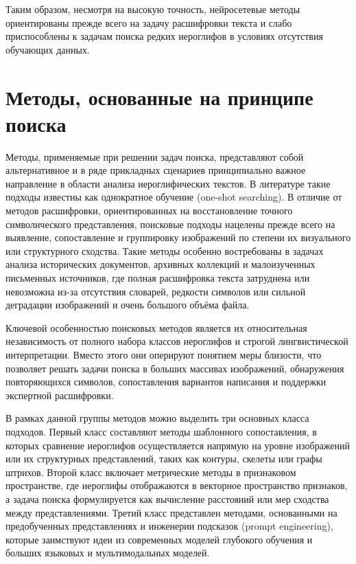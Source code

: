 Таким образом, несмотря на высокую точность, нейросетевые методы ориентированы прежде всего на задачу расшифровки текста и слабо приспособлены к задачам поиска редких иероглифов в условиях отсутствия обучающих данных.


\section{Методы, основанные на принципе поиска}\label{sec:ch1/sec2}
Методы, применяемые при решении задач поиска, представляют собой альтернативное и в ряде прикладных сценариев принципиально важное направление в области анализа иероглифических текстов. В литературе такие подходы известны как однократное обучение (one-shot searching)\cite{vinyals2016matching, snell2017prototypical, he2020memory}. В отличие от методов расшифровки, ориентированных на восстановление точного символического представления, поисковые подходы нацелены прежде всего на выявление, сопоставление и группировку изображений по степени их визуального или структурного сходства. Такие методы особенно востребованы в задачах анализа исторических документов, архивных коллекций и малоизученных письменных источников, где полная расшифровка текста затруднена или невозможна из-за отсутствия словарей, редкости символов или сильной деградации изображений и очень большого объёма файла.

Ключевой особенностью поисковых методов является их относительная независимость от полного набора классов иероглифов и строгой лингвистической интерпретации. Вместо этого они оперируют понятием меры близости, что позволяет решать задачи поиска в больших массивах изображений, обнаружения повторяющихся символов, сопоставления вариантов написания и поддержки экспертной расшифровки.

В рамках данной группы методов можно выделить три основных класса подходов. Первый класс составляют методы шаблонного сопоставления, в которых сравнение иероглифов осуществляется напрямую на уровне изображений или их структурных представлений, таких как контуры, скелеты или графы штрихов. Второй класс включает метрические методы в признаковом пространстве, где иероглифы отображаются в векторное пространство признаков, а задача поиска формулируется как вычисление расстояний или мер сходства между представлениями. Третий класс представлен методами, основанными на предобученных представлениях и инженерии подсказок (prompt engineering), которые заимствуют идеи из современных моделей глубокого обучения и больших языковых и мультимодальных моделей.

